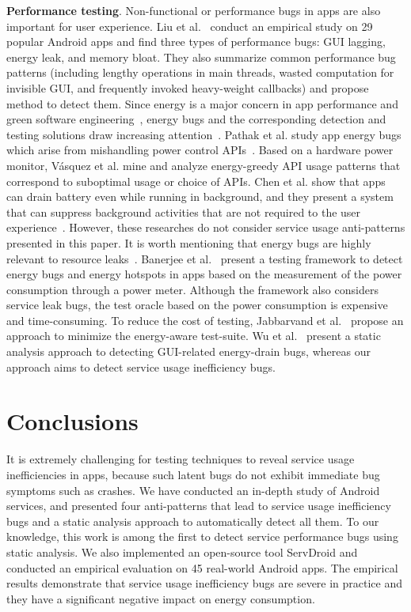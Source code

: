 \documentclass[sigconf,review, anonymous]{acmart}
\begin{document}
\textbf{Performance testing}. Non-functional or performance bugs in apps are
also important for user experience. Liu et al.~\cite{LiuXC14} conduct an
empirical study on 29 popular Android apps and find three types of performance
bugs: GUI lagging, energy leak, and memory bloat. They also summarize common
performance bug patterns (including lengthy operations in main threads, wasted
computation for invisible GUI, and frequently invoked heavy-weight callbacks)
and propose method to detect them. Since energy is a major concern in app
performance and green software
engineering~\cite{PangHAH16,HoqueSKXT16,MBZSJSPC16,0036990}, energy bugs and the
corresponding detection and testing solutions draw increasing attention~\cite{QianWGMSS11,PathakJHM12,VasquezBBOPP14,GuoZYZZ13,BanerjeeC0R14,LiuXCL14,BehrouzSBM16,WuYR16,JabbarvandM17}.
Pathak et al. study app energy bugs which arise from mishandling power control APIs~\cite{PathakJHM12}.  Based on a hardware power monitor, V{\'{a}}squez et al. mine and
analyze energy-greedy API usage patterns that correspond to suboptimal usage or choice of APIs. Chen et al. show that apps can drain battery even while running in background, and they present a system that can suppress background activities that are not required to the user experience~\cite{ChenJDHGV15}. However, these researches do not consider service usage anti-patterns presented in this paper. It is worth mentioning that energy bugs are highly relevant to resource
leaks~\cite{GuoZYZZ13,BanerjeeC0R14,LiuXCL14,WuYR16}. Banerjee et
al.~\cite{BanerjeeC0R14,BanerjeeCBR18} present a testing framework to detect energy bugs and
energy hotspots in apps based on the measurement of the power consumption through a power meter.
Although the framework also considers service leak bugs, the test oracle based
on the power consumption is expensive and time-consuming.
To reduce the cost of testing, Jabbarvand et al.~\cite{BehrouzSBM16} propose an
approach to minimize the energy-aware test-suite. Wu et
al.~\cite{WuYR16} present a static analysis approach to detecting GUI-related energy-drain
bugs, whereas our approach aims to detect service usage inefficiency bugs.

\section{Conclusions}\label{conclusion}
It is extremely challenging for testing techniques to reveal service usage
inefficiencies in apps, because such latent bugs do not exhibit
immediate bug symptoms such as crashes.
We have conducted an in-depth study of Android services, and presented four
anti-patterns that lead to service usage inefficiency bugs and a static
analysis approach to automatically detect all them. To our knowledge,
this work is among the first to detect service performance bugs using static
analysis. We also implemented an open-source tool {\sf ServDroid} and conducted
an empirical evaluation on 45 real-world Android apps. The empirical results
demonstrate that service usage inefficiency bugs are severe in practice and they
have a significant negative impact on energy consumption.
\end{document}

